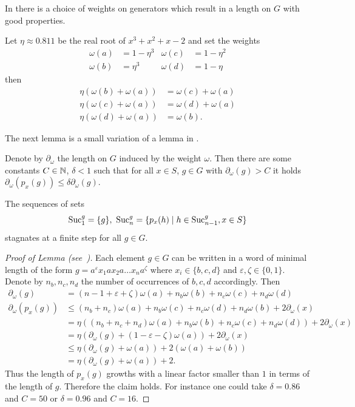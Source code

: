 \documentclass[a4paper,11pt]{amsart}
\begin{document}
In \cite{Bartholdi:Growth} there is a choice of weights on generators which result in a length on $G$ with good properties.
\begin{lem} \label{lem:laurentsweights}
 Let $\eta\approx 0.811$ be the real root of $x^3+x^2+x-2$ and set the weights 
 \begin{align*}
  \omega(a) &= 1-\eta^3 & \omega(c)&=1-\eta^2 \\ \omega(b)&= \eta^3 & \omega(d)&=1-\eta
 \end{align*}
 then 
 \begin{align*}
  \eta(\omega(b)+\omega(a)) &= \omega(c)+\omega(a) \\
  \eta(\omega(c)+\omega(a)) &= \omega(d)+\omega(a) \\
  \eta(\omega(d)+\omega(a)) &= \omega(b).
 \end{align*}
\end{lem}
The next lemma is a small variation of a lemma in \cite{Bartholdi:Growth}.
\begin{lem}
 Denote by $\partial_\omega$ the length on $G$ induced by the weight $\omega$. Then
 there are some constants $C\in\mathbb{N}$, $\delta<1$ such that for all $x\in S$, $g\in G$ 
 with $\partial_\omega(g)>C$ it holds 
 $\partial_\omega(p_x(g)) \leq \delta \partial_\omega(g)$.
\end{lem}
\begin{cor}
The sequences of sets
 \[\textup{Suc}_1^g=\{g\},\ \textup{Suc}_n^g = \{p_x(h) \mid h\in \textup{Suc}_{n-1}^g, x\in S\} \]
 stagnates at a finite step for all $g\in G$.
\end{cor}
\begin{proof}[Proof of Lemma (see~{\cite[Proposition~5]{Bartholdi:Growth}})] 
 Each element $g\in G$ can be written in a word of minimal length of the form $g=a^\varepsilon x_1 a x_2 a\ldots x_n a^\zeta$ where
 $x_i\in \{b,c,d\}$ and $\varepsilon,\zeta\in \{0,1\}$. Denote by $n_b,n_c,n_d$ the number of occurrences of $b,c,d$ accordingly. 
 Then
 \begin{align*}
  \partial_\omega(g) &= (n-1+\varepsilon+\zeta)\omega(a)+n_b\omega(b)+n_c\omega(c)+n_d\omega(d)\\
  \partial_\omega(p_x(g)) &\leq (n_b+n_c)\omega(a)+n_b\omega(c)+n_c\omega(d)+n_d\omega(b) + 2\partial_\omega(x)\\
  &= \eta\left( (n_b+n_c+n_d)\omega(a)+n_b\omega(b)+n_c\omega(c)+n_d\omega(d) \right) + 2\partial_\omega(x)\\
  &= \eta(\partial_\omega(g) +(1-\varepsilon-\zeta)\omega(a)) + 2\partial_\omega(x) \\
  &\leq \eta(\partial_\omega(g)+\omega(a)) + 2(\omega(a)+\omega(b))\\
  &= \eta(\partial_\omega(g)+\omega(a)) + 2.
 \end{align*}
 Thus the length of $p_x(g)$ growths with a linear factor smaller than $1$ in terms of the length of $g$. Therefore the claim holds.
 For instance one could take $\delta =0.86$ and $C=50$ or $\delta=0.96$ and $C=16$.
\end{proof}
\end{document}
